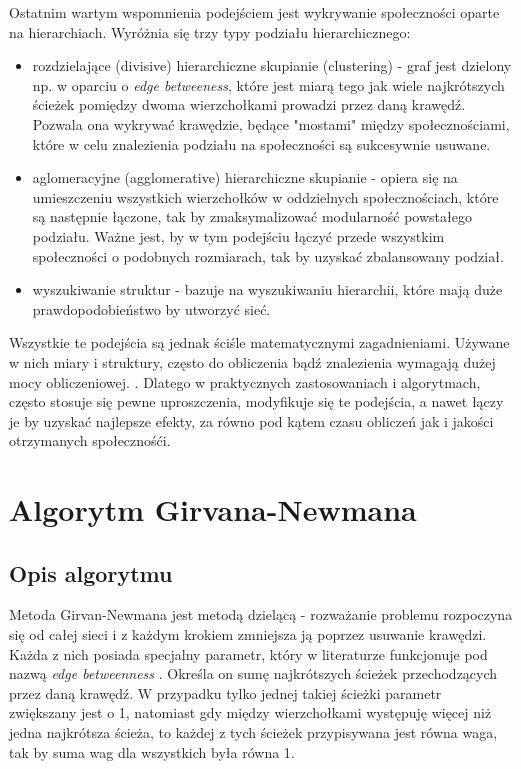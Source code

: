 \documentclass{article}
\begin{document}
Ostatnim wartym wspomnienia podejściem jest wykrywanie społeczności oparte na hierarchiach. Wyróżnia się trzy typy podziału hierarchicznego:
\begin{itemize}
\item rozdzielające (divisive) hierarchiczne skupianie (clustering) - graf jest dzielony np. w oparciu o \textit{edge betweeness}, które jest miarą tego jak wiele najkrótszych ścieżek pomiędzy dwoma wierzchołkami prowadzi przez daną krawędź. Pozwala ona wykrywać krawędzie, będące "mostami" między społecznościami, które w celu znalezienia podziału na społeczności są sukcesywnie usuwane.
\item aglomeracyjne (agglomerative) hierarchiczne skupianie - opiera się na umieszczeniu wszystkich wierzchołków w oddzielnych społecznościach, które są następnie łączone, tak by zmaksymalizować modularność powstałego podziału. Ważne jest, by w tym podejściu łączyć przede wszystkim społeczności o podobnych rozmiarach, tak by uzyskać zbalansowany podział.
\item wyszukiwanie struktur - bazuje na wyszukiwaniu hierarchii, które mają duże prawdopodobieństwo by utworzyć sieć.
\end{itemize}

Wszystkie te podejścia są jednak ściśle matematycznymi zagadnieniami. Używane w nich miary i struktury, często do obliczenia bądź znalezienia wymagają dużej mocy obliczeniowej. \cite{pw-paper1}. Dlatego w praktycznych zastosowaniach i algorytmach, często stosuje się pewne uproszczenia, modyfikuje się te podejścia, a nawet łączy je by uzyskać najlepsze efekty, za równo pod kątem czasu obliczeń jak i jakości otrzymanych społecznośći.
\newpage
\section{Algorytm Girvana-Newmana}
\subsection{Opis algorytmu}
Metoda Girvan-Newmana jest metodą dzielącą - rozważanie problemu rozpoczyna się od całej sieci i z każdym krokiem zmniejsza ją poprzez usuwanie krawędzi. Każda z nich posiada specjalny parametr, który w literaturze funkcjonuje pod nazwą \textit{edge betweenness} \cite{is-paper1}. Określa on sumę najkrótszych ścieżek przechodzących przez daną krawędź. W przypadku tylko jednej takiej ścieżki parametr zwiększany jest o 1, natomiast gdy między wierzchołkami występuję więcej niż jedna najkrótsza ścieża, to każdej z tych ścieżek przypisywana jest równa waga, tak by suma wag dla wszystkich była równa 1.
\end{document}
